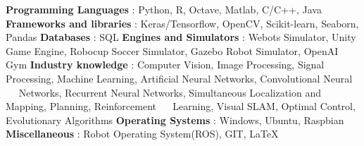 \begin{cventries}  
\skillentry
    {
    \bullet \space \textbf{Programming Languages} : Python, R, Octave, Matlab, C/C++, Java \newline
    \bullet \space \textbf{Frameworks and libraries} : Keras/Tensorflow, OpenCV, Scikit-learn, Seaborn, Pandas   \newline
    \bullet \space \textbf{Databases} : SQL
    \bullet \space \textbf{Engines and Simulators} : Webots Simulator, Unity Game Engine, Robocup Soccer Simulator, Gazebo Robot Simulator, OpenAI Gym \newline
    \bullet \space \textbf{Industry knowledge} : Computer Vision, Image Processing, Signal Processing, Machine Learning, Artificial Neural Networks, Convolutional Neural \newline $\quad$ Networks, Recurrent Neural Networks, Simultaneous Localization and Mapping, Planning, Reinforcement \newline $\quad$ Learning, Visual SLAM, Optimal Control, Evolutionary Algorithms   \newline
    \bullet \space \textbf{Operating Systems} : Windows, Ubuntu, Raspbian \newline
    \bullet \space \textbf{Miscellaneous} : Robot Operating System(ROS), GIT, LaTeX
    }
\end{cventries}
